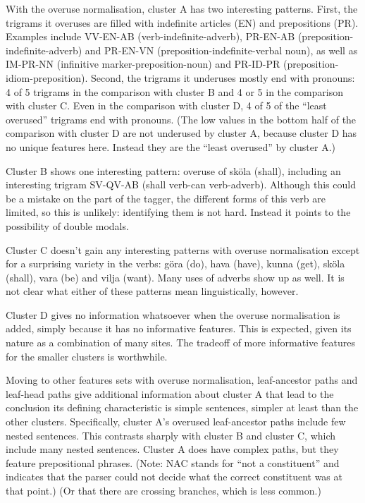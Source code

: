 With the overuse normalisation, cluster A has two interesting
patterns. First, the trigrams it overuses are filled with indefinite
articles (EN) and prepositions (PR). Examples include VV-EN-AB
(verb-indefinite-adverb), PR-EN-AB (preposition-indefinite-adverb) and
PR-EN-VN (preposition-indefinite-verbal noun), as well as IM-PR-NN
(infinitive marker-preposition-noun) and PR-ID-PR
(preposition-idiom-preposition). Second, the trigrams it underuses
mostly end with pronouns: 4 of 5 trigrams in the comparison with
cluster B and 4 or 5 in the comparison with cluster C. Even in the
comparison with cluster D, 4 of 5 of the ``least overused'' trigrams
end with pronouns. (The low values in the bottom half of the
comparison with cluster D are not underused by cluster A, because
cluster D has no unique features here. Instead they are the ``least
overused'' by cluster A.)

Cluster B shows one interesting pattern: overuse of sk\"ola (shall),
including an interesting trigram SV-QV-AB (shall verb-can
verb-adverb). Although this could be a mistake on the part of the
tagger, the different forms of this verb are limited, so this is
unlikely: identifying them is not hard. Instead it points to the
possibility of double modals.

Cluster C doesn't gain any interesting patterns with overuse
normalisation except for a surprising variety in the verbs: g\"ora
(do), hava (have), kunna (get), sk\"ola (shall), vara (be) and vilja
(want). Many uses of adverbs show up as well. It is not clear what
either of these patterns mean linguistically, however.

Cluster D gives no information whatsoever when the overuse
normalisation is added, simply because it has no informative
features. This is expected, given its nature as a combination of many
sites. The tradeoff of more informative features for the smaller
clusters is worthwhile.

Moving to other features sets with overuse normalisation,
leaf-ancestor paths and leaf-head paths give additional information
about cluster A that lead to the conclusion its defining
characteristic is simple sentences, simpler at least than the other
clusters. Specifically, cluster A's overused leaf-ancestor paths
include few nested sentences. This contrasts sharply with cluster B
and cluster C, which include many nested sentences. Cluster A does
have complex paths, but they feature prepositional phrases. (Note: NAC
stands for ``not a constituent'' and indicates that the parser could
not decide what the correct constituent was at that point.) (Or that
there are crossing branches, which is less common.)

